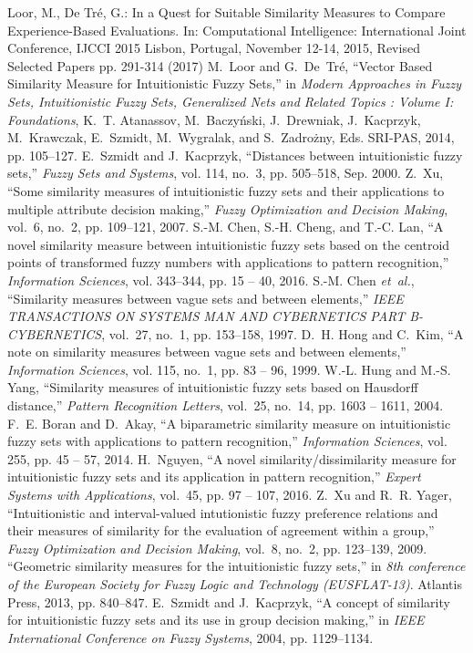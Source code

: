 \documentclass[a4paper,10pt]{article}
\begin{document}
\begin{thebibliography}{00}
 Loor, M., De Tr{\'e}, G.: In a Quest for Suitable Similarity Measures to Compare Experience-Based Evaluations. In: Computational Intelligence: International Joint Conference, IJCCI 2015 Lisbon, Portugal, November 12-14, 2015, Revised Selected Papers pp. 291-314 (2017)
 M.~Loor and G.~De~Tr{\'e}, ``{{Vector Based Similarity Measure for Intuitionistic Fuzzy Sets}},'' in \emph{{{Modern Approaches in Fuzzy Sets, Intuitionistic Fuzzy Sets, Generalized Nets and Related Topics : Volume I: Foundations}}}, K.~T. Atanassov, M.~Baczy{\'n}ski, J.~Drewniak, J.~Kacprzyk, M.~Krawczak, E.~Szmidt, M.~Wygralak, and S.~Zadro{\.z}ny, Eds. SRI-PAS, 2014, pp. 105--127.
 E.~Szmidt and J.~Kacprzyk, ``{Distances between intuitionistic fuzzy sets},'' \emph{Fuzzy Sets and Systems}, vol. 114, no.~3, pp. 505--518, Sep. 2000.
 Z.~Xu, ``Some similarity measures of intuitionistic fuzzy sets and their applications to multiple attribute decision making,'' \emph{Fuzzy Optimization and Decision Making}, vol.~6, no.~2, pp. 109--121, 2007.
 S.-M. Chen, S.-H. Cheng, and T.-C. Lan, ``A novel similarity measure between intuitionistic fuzzy sets based on the centroid points of transformed fuzzy numbers with applications to pattern recognition,'' \emph{Information Sciences}, vol. 343--344, pp. 15 -- 40, 2016.
 S.-M. Chen \emph{et~al.}, ``Similarity measures between vague sets and between elements,'' \emph{IEEE TRANSACTIONS ON SYSTEMS MAN AND CYBERNETICS PART B-CYBERNETICS}, vol.~27, no.~1, pp. 153--158, 1997.
 D.~H. Hong and C.~Kim, ``A note on similarity measures between vague sets and between elements,'' \emph{Information Sciences}, vol. 115, no.~1, pp. 83 --
  96, 1999.
 W.-L. Hung and M.-S. Yang, ``Similarity measures of intuitionistic fuzzy sets based on Hausdorff distance,'' \emph{Pattern Recognition Letters}, vol.~25, no.~14, pp. 1603 -- 1611, 2004.
 F.~E. Boran and D.~Akay, ``A biparametric similarity measure on intuitionistic fuzzy sets with applications to pattern recognition,'' \emph{Information Sciences}, vol. 255, pp. 45 -- 57, 2014.
 H.~Nguyen, ``A novel similarity/dissimilarity measure for intuitionistic fuzzy sets and its application in pattern recognition,'' \emph{Expert Systems with Applications}, vol.~45, pp. 97 -- 107, 2016.
 Z.~Xu and R.~R. Yager, ``Intuitionistic and interval-valued intutionistic fuzzy preference relations and their measures of similarity for the evaluation of agreement within a group,'' \emph{Fuzzy Optimization and Decision Making},  vol.~8, no.~2, pp. 123--139, 2009.
 ``Geometric similarity measures for the intuitionistic fuzzy sets,'' in \emph{8th conference of the European Society for Fuzzy Logic and Technology  (EUSFLAT-13)}. Atlantis Press, 2013,  pp. 840--847.
 E.~Szmidt and J.~Kacprzyk, ``A concept of similarity for intuitionistic fuzzy sets and its use in group decision making,'' in \emph{IEEE International Conference on Fuzzy Systems}, 2004, pp. 1129--1134.
\end{thebibliography}
 
\end{document}
